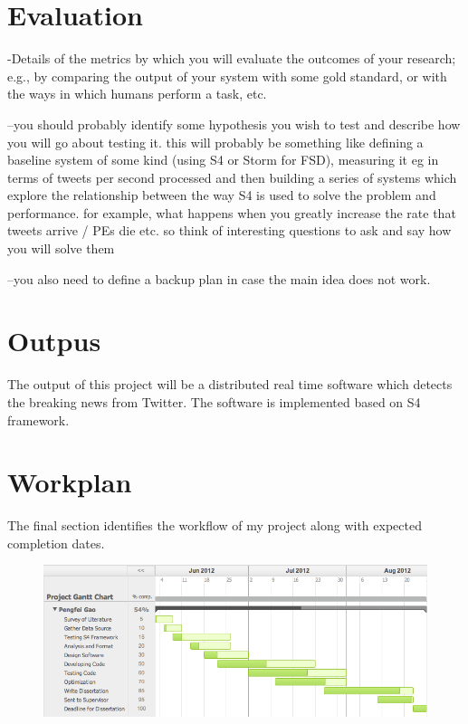 \documentclass[a4paper,12pt]{article}
\begin{document}
\section{Evaluation}

-Details of the metrics by which you will evaluate the outcomes of your research; e.g., by comparing the output of your system with some gold standard, or with the ways in which humans perform a task, etc.


--you should probably identify some hypothesis you wish to test and
describe how you will go about testing it.  this will probably be
something like defining a baseline system of some kind (using S4 or
Storm for FSD), measuring it eg in terms of tweets per second
processed and then building a series of systems which explore the
relationship between the way S4 is used to solve the problem and
performance.  for example, what happens when you greatly increase the
rate that tweets arrive / PEs die etc.  so think of  interesting
questions to ask and say how you will solve them

--you also need to define a backup plan in case the main idea does not work.



\section{Outpus}



The output of this project will be a distributed real time software which detects the breaking news from Twitter. The software is implemented based on S4 framework.




\section{Workplan}

The final section identifies the workflow of my project along with expected completion dates. 

\begin{figure}[h]
\begin{center}
\includegraphics[scale=0.6]{gantt.png}
\end{center}
\end{figure}








\end{document}
